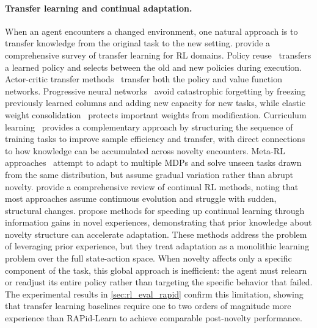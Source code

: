 \paragraph{Transfer learning and continual adaptation.}
When an agent encounters a changed environment, one natural approach is to transfer knowledge from the original task to the new setting. \citet{taylor2009transfer} provide a comprehensive survey of transfer learning for RL domains. Policy reuse~\citep{glatt2017policy} transfers a learned policy and selects between the old and new policies during execution. Actor-critic transfer methods~\citep{clegg2017haptics} transfer both the policy and value function networks. Progressive neural networks~\citep{rusu2016progressive} avoid catastrophic forgetting by freezing previously learned columns and adding new capacity for new tasks, while elastic weight consolidation~\citep{kirkpatrick2017overcoming} protects important weights from modification. Curriculum learning~\citep{narvekar2020curriculum,narvekar2016source} provides a complementary approach by structuring the sequence of training tasks to improve sample efficiency and transfer, with direct connections to how knowledge can be accumulated across novelty encounters. Meta-RL approaches~\citep{yu2020metaworld} attempt to adapt to multiple MDPs and solve unseen tasks drawn from the same distribution, but assume gradual variation rather than abrupt novelty. \citet{khetarpal2022continual} provide a comprehensive review of continual RL methods, noting that most approaches assume continuous evolution and struggle with sudden, structural changes. \citet{lorang2022speeding} propose methods for speeding up continual learning through information gains in novel experiences, demonstrating that prior knowledge about novelty structure can accelerate adaptation. These methods address the problem of leveraging prior experience, but they treat adaptation as a monolithic learning problem over the full state-action space. When novelty affects only a specific component of the task, this global approach is inefficient: the agent must relearn or readjust its entire policy rather than targeting the specific behavior that failed. The experimental results in \cref{sec:rl_eval_rapid} confirm this limitation, showing that transfer learning baselines require one to two orders of magnitude more experience than RAPid-Learn to achieve comparable post-novelty performance.

